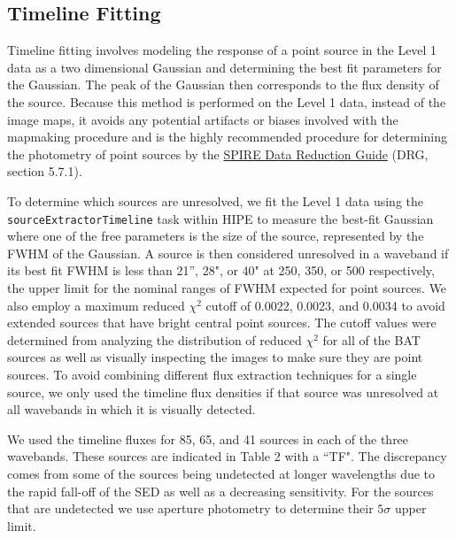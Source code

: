 \subsection{Timeline Fitting}\label{timeline}
Timeline fitting involves modeling the response of a point source in the Level 1 data as a two dimensional Gaussian and determining the best fit parameters for the Gaussian. The peak of the Gaussian then corresponds to the flux density of the source. Because this method is performed on the Level 1 data, instead of the image maps, it avoids any potential artifacts or biases involved with the mapmaking procedure and is the highly recommended procedure for determining the photometry of point sources by the \href{http://herschel.esac.esa.int/hcss-doc-11.0/index.jsp\#spire_drg:_start}{SPIRE Data Reduction Guide} (DRG, section 5.7.1).

To determine which sources are unresolved, we fit the Level 1 data using the \texttt{sourceExtractorTimeline} task within HIPE to measure the best-fit Gaussian where one of the free parameters is the size of the source, represented by the FWHM of the Gaussian. A source is then considered unresolved in a waveband if its best fit FWHM is less than 21'', 28", or 40" at 250, 350, or 500 \um{} respectively, the upper limit for the nominal ranges of FWHM expected for point sources. We also employ a maximum reduced $\chi^{2}$ cutoff of 0.0022, 0.0023, and 0.0034 to avoid extended sources that have bright central point sources. The cutoff values were determined from analyzing the distribution of reduced $\chi^{2}$ for all of the BAT sources as well as visually inspecting the images to make sure they are point sources. To avoid combining different flux extraction techniques for a single source, we only used the timeline flux densities if that source was unresolved at all wavebands in which it is visually detected.

We used the timeline fluxes for 85, 65, and 41 sources in each of the three wavebands. These sources are indicated in Table 2 with a ``TF". The discrepancy comes from some of the sources being undetected at longer wavelengths due to the rapid fall-off of the SED as well as a decreasing sensitivity. For the sources that are undetected we use aperture photometry to determine their $5\sigma$ upper limit. 

  
  